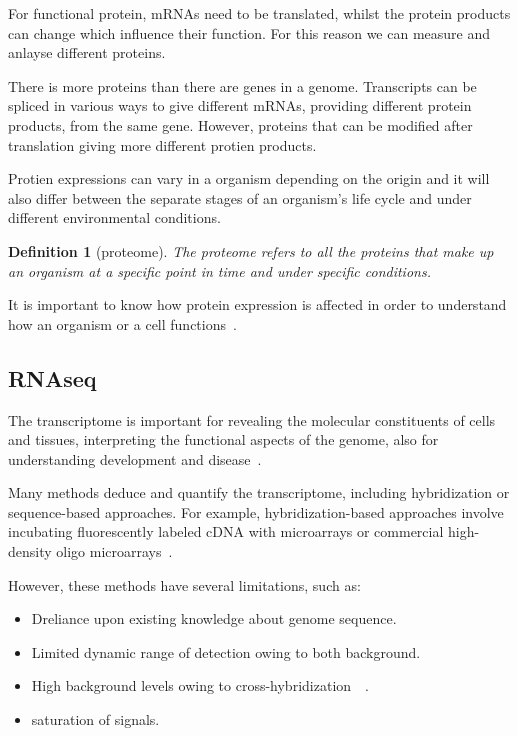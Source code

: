 \documentclass{report}
\newtheorem{definition}{Definition}[section]
\begin{document}
For functional protein, mRNAs need to be translated, whilst the protein products can change which influence their function. For this reason we can measure and anlayse different proteins. 

There is more proteins than there are genes in a genome. Transcripts can be spliced in various ways to give different mRNAs, providing different protein products, from the same gene. However, proteins that can be modified after translation giving more different protien products.

Protien expressions can vary in a organism depending on the origin and it will also differ between the separate stages of an organism’s life cycle and under different environmental conditions. 

\begin{definition}[proteome]
    The proteome refers to all the proteins that make up an organism at a specific point in time and under specific conditions.
\end{definition}

It is important to know how protein expression is affected in order to understand how an organism or a cell functions~\cite{zvelebil_understanding_2008}.

\subsection{RNAseq}

The transcriptome is important for revealing the molecular constituents of cells and tissues, interpreting the functional aspects of the genome, also for understanding development and disease~\cite{wang_rna-seq_2009}.

Many methods deduce and quantify the transcriptome, including hybridization or sequence-based approaches. For example, hybridization-based approaches involve incubating fluorescently labeled cDNA with microarrays or commercial high-density oligo microarrays~\cite{wang_rna-seq_2009}.

However, these methods have several limitations, such as: 
\begin{itemize}
    \item Dreliance upon existing knowledge about genome sequence.
    \item Limited dynamic range of detection owing to both background.
    \item High background levels owing to cross-hybridization~\cite{okoniewski_hybridization_2006}~\cite{royce_toward_2007}.
    \item saturation of signals.
\end{itemize}
\end{document}
